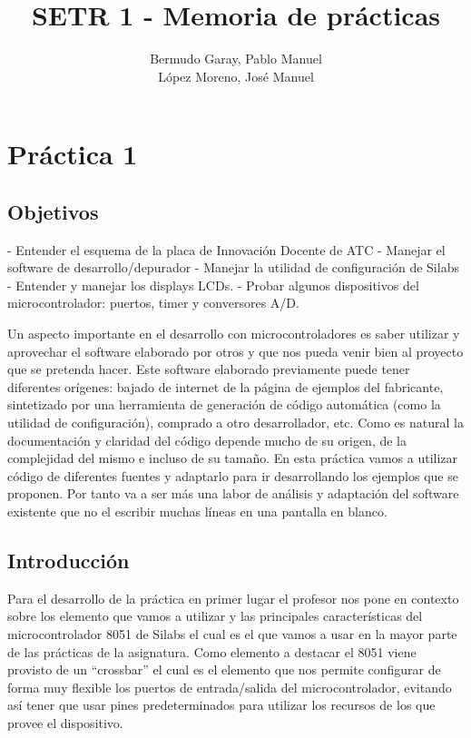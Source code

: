 \documentclass[a4paper, 11pt]{article}
\begin{document}
\title{\Huge SETR 1 - Memoria de prácticas}
\author{Bermudo Garay, Pablo Manuel\\
López Moreno, José Manuel}
\date{}
\maketitle{}
\thispagestyle{empty}
\newpage

\tableofcontents{}
\newpage

\section{Práctica 1}
\subsection{Objetivos}
- Entender el esquema de la placa de Innovación Docente de ATC
- Manejar el software de desarrollo/depurador
- Manejar la utilidad de configuración de Silabs
- Entender y manejar los displays LCDs.
- Probar algunos dispositivos del microcontrolador: puertos, timer
y conversores A/D.

Un aspecto importante en el desarrollo con microcontroladores es
saber utilizar y aprovechar el software elaborado por otros y que
nos pueda venir bien al proyecto que se pretenda hacer.  Este
software elaborado previamente puede tener diferentes orígenes:
bajado de internet de la página de ejemplos del fabricante,
sintetizado por una herramienta de generación de código automática
(como la utilidad de configuración), comprado a otro desarrollador,
etc. Como es natural la documentación y claridad del código depende
mucho de su origen, de la complejidad del mismo e incluso de su
tamaño. En esta práctica vamos a utilizar código de diferentes
fuentes y adaptarlo para ir desarrollando los ejemplos que se
proponen. Por tanto va a ser más una labor de análisis y adaptación
del software existente que no el escribir muchas líneas en una
pantalla en blanco.

\subsection{Introducción}
Para el desarrollo de la práctica en primer lugar el profesor nos
pone en contexto sobre los elemento que vamos a utilizar y las
principales características del microcontrolador 8051 de Silabs el
cual es el que vamos a usar en la mayor parte de las prácticas de
la asignatura. Como elemento a destacar el 8051 viene provisto de
un ``crossbar'' el cual es el elemento que nos permite configurar
de forma muy flexible los puertos de entrada/salida del
microcontrolador, evitando así tener que usar pines predeterminados
para utilizar los recursos de los que provee el dispositivo.
\end{document}
